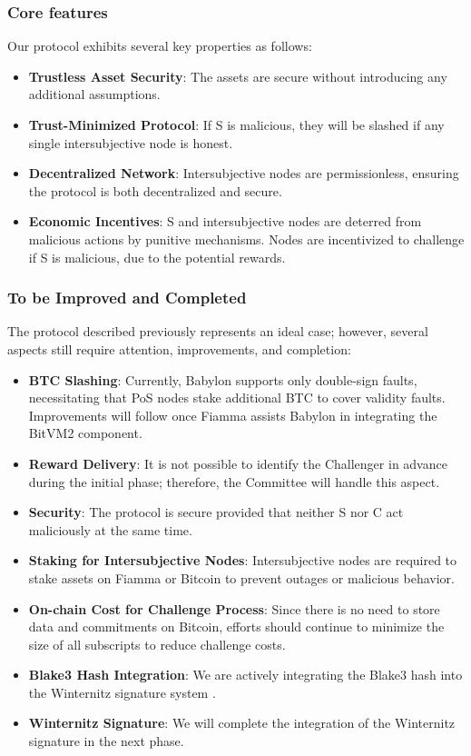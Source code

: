 \subsubsection{Core features}

Our protocol exhibits several key properties as follows:

\begin{itemize}
    \item \textbf{Trustless Asset Security}: The assets are secure without introducing any additional assumptions.
    \item \textbf{Trust-Minimized Protocol}: If S is malicious, they will be slashed if any single intersubjective node is honest.
    \item \textbf{Decentralized Network}: Intersubjective nodes are permissionless, ensuring the protocol is both decentralized and secure.
    \item \textbf{Economic Incentives}: S and intersubjective nodes are deterred from malicious actions by punitive mechanisms. Nodes are incentivized to challenge if S is malicious, due to the potential rewards.
\end{itemize}


\subsubsection{To be Improved and Completed}

The protocol described previously represents an ideal case; however, several aspects still require attention, improvements, and completion:

\begin{itemize}
    \item \textbf{BTC Slashing}: Currently, Babylon supports only double-sign faults, necessitating that PoS nodes stake additional BTC to cover validity faults. Improvements will follow once Fiamma assists Babylon in integrating the BitVM2 component.
    \item \textbf{Reward Delivery}: It is not possible to identify the Challenger in advance during the initial phase; therefore, the Committee will handle this aspect.
    \item \textbf{Security}: The protocol is secure provided that neither S nor C act maliciously at the same time.
    \item \textbf{Staking for Intersubjective Nodes}: Intersubjective nodes are required to stake assets on Fiamma or Bitcoin to prevent outages or malicious behavior.
    \item \textbf{On-chain Cost for Challenge Process}: Since there is no need to store data and commitments on Bitcoin, efforts should continue to minimize the size of all subscripts to reduce challenge costs.
    \item \textbf{Blake3 Hash Integration}: We are actively integrating the Blake3 hash into the Winternitz signature system \cite{website:witernitz}.
    \item \textbf{Winternitz Signature}: We will complete the integration of the Winternitz signature in the next phase.
\end{itemize}
